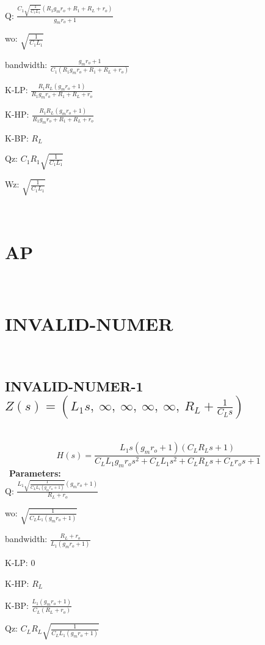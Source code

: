 \documentclass{article}
\begin{document}
Q: $\frac{C_{1} \sqrt{\frac{1}{C_{1} L_{1}}} \left(R_{1} g_{m} r_{o} + R_{1} + R_{L} + r_{o}\right)}{g_{m} r_{o} + 1}$\ 

wo: $\sqrt{\frac{1}{C_{1} L_{1}}}$\ 

bandwidth: $\frac{g_{m} r_{o} + 1}{C_{1} \left(R_{1} g_{m} r_{o} + R_{1} + R_{L} + r_{o}\right)}$\ 

K-LP: $\frac{R_{1} R_{L} \left(g_{m} r_{o} + 1\right)}{R_{1} g_{m} r_{o} + R_{1} + R_{L} + r_{o}}$\ 

K-HP: $\frac{R_{1} R_{L} \left(g_{m} r_{o} + 1\right)}{R_{1} g_{m} r_{o} + R_{1} + R_{L} + r_{o}}$\ 

K-BP: $R_{L}$\ 

Qz: $C_{1} R_{1} \sqrt{\frac{1}{C_{1} L_{1}}}$\ 

Wz: $\sqrt{\frac{1}{C_{1} L_{1}}}$\ 

\ 

\section{AP}\ 
\section{INVALID-NUMER}\ 
\subsection{INVALID-NUMER-1 $Z(s) = \left( L_{1} s, \  \infty, \  \infty, \  \infty, \  \infty, \  R_{L} + \frac{1}{C_{L} s}\right)$ } \ 
\textbf{\[H(s) = \frac{L_{1} s \left(g_{m} r_{o} + 1\right) \left(C_{L} R_{L} s + 1\right)}{C_{L} L_{1} g_{m} r_{o} s^{2} + C_{L} L_{1} s^{2} + C_{L} R_{L} s + C_{L} r_{o} s + 1}\] } \ 
\textbf{Parameters:}\\ 

Q: $\frac{L_{1} \sqrt{\frac{1}{C_{L} L_{1} \left(g_{m} r_{o} + 1\right)}} \left(g_{m} r_{o} + 1\right)}{R_{L} + r_{o}}$\ 

wo: $\sqrt{\frac{1}{C_{L} L_{1} \left(g_{m} r_{o} + 1\right)}}$\ 

bandwidth: $\frac{R_{L} + r_{o}}{L_{1} \left(g_{m} r_{o} + 1\right)}$\ 

K-LP: $0$\ 

K-HP: $R_{L}$\ 

K-BP: $\frac{L_{1} \left(g_{m} r_{o} + 1\right)}{C_{L} \left(R_{L} + r_{o}\right)}$\ 

Qz: $C_{L} R_{L} \sqrt{\frac{1}{C_{L} L_{1} \left(g_{m} r_{o} + 1\right)}}$\ 
\end{document}

